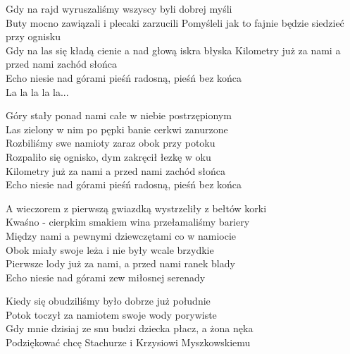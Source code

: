 \begin{text}
    \small{
Gdy na rajd wyruszaliśmy wszyscy byli dobrej myśli\\
Buty mocno zawiązali i plecaki zarzucili
Pomyśleli jak to fajnie będzie siedzieć przy ognisku\\
Gdy na las się kładą cienie a nad głową iskra błyska
Kilometry już za nami a przed nami zachód słońca\\
Echo niesie nad górami pieśń radosną, pieśń bez końca\\
La la la la la...

Góry stały ponad nami całe w niebie postrzępionym\\
Las zielony w nim po pępki banie cerkwi zanurzone\\
Rozbiliśmy swe namioty zaraz obok przy potoku\\
Rozpaliło się ognisko, dym zakręcił łezkę w oku\\
Kilometry już za nami a przed nami zachód słońca\\
Echo niesie nad górami pieśń radosną, pieśń bez końca

A wieczorem z pierwszą gwiazdką wystrzeliły z bełtów korki\\
Kwaśno - cierpkim smakiem wina przełamaliśmy bariery\\
Między nami a pewnymi dziewczętami co w namiocie\\
Obok miały swoje leża i nie były wcale brzydkie\\
Pierwsze lody już za nami, a przed nami ranek blady\\
Echo niesie nad górami zew miłosnej serenady

Kiedy się obudziliśmy było dobrze już południe\\
Potok toczył za namiotem swoje wody porywiste\\
Gdy mnie dzisiaj ze snu budzi dziecka płacz, a żona nęka\\
Podziękować chcę Stachurze i Krzysiowi Myszkowskiemu\\
    }
\end{text}